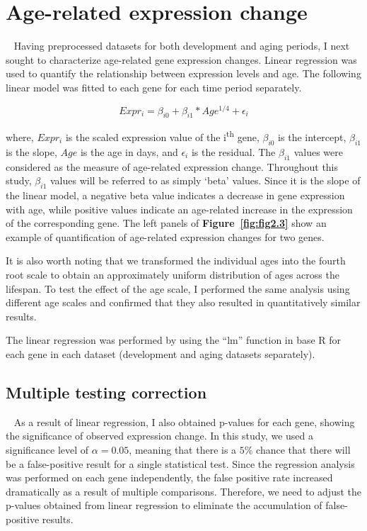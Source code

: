 \section{Age-related expression change}~\label{sec:exp-change}
Having preprocessed datasets for both development and aging periods, I next sought to characterize age-related gene expression changes. 
Linear regression was used to quantify the relationship between expression levels and age. 
The following linear model was fitted to each gene for each time period separately.

\begin{equation}
    Expr_i = \beta_{i0} + \beta_{i1} * Age^{1/4} + \epsilon_i
    \label{eq:exp_change}
\end{equation}

where, $Expr_i$ is the scaled expression value of the i\textsuperscript{th} gene, $\beta_{i0}$ is the intercept, $\beta_{i1}$ is the slope, $Age$ is the age in days, and $\epsilon_i$ is the residual.
The $\beta_{i1}$ values were considered as the measure of age-related expression change. Throughout this study, $\beta_{i1}$ values will be referred to as simply `beta' values.
Since it is the slope of the linear model, a negative beta value indicates a decrease in gene expression with age, while positive values indicate an age-related increase in the expression of the corresponding gene. 
The left panels of \textbf{Figure~\ref{fig:fig2.3}} show an example of quantification of age-related expression changes for two genes.

It is also worth noting that we transformed the individual ages into the fourth root scale to obtain an approximately uniform distribution of ages across the lifespan.
To test the effect of the age scale, I performed the same analysis using different age scales and confirmed that they also resulted in quantitatively similar results.

The linear regression was performed by using the ``lm'' function in base R for each gene in each dataset (development and aging datasets separately).

\subsection{Multiple testing correction}~\label{subsec:p.adjust}
As a result of linear regression, I also obtained p-values for each gene, showing the significance of observed expression change.
In this study, we used a significance level of $\alpha = 0.05$, meaning that there is a $5\%$ chance that there will be a false-positive result for a single statistical test.
Since the regression analysis was performed on each gene independently, the false positive rate increased dramatically as a result of multiple comparisons.
Therefore, we need to adjust the p-values obtained from linear regression to eliminate the accumulation of false-positive results.


